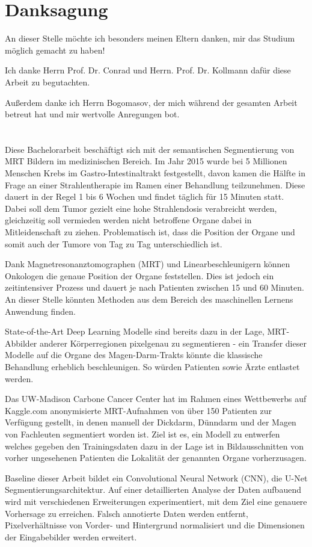 
\section*{Danksagung}

An dieser Stelle möchte ich besonders meinen Eltern danken, mir das Studium möglich gemacht zu haben!

Ich danke Herrn Prof. Dr. Conrad und Herrn. Prof. Dr. Kollmann dafür diese Arbeit zu begutachten.

Außerdem danke ich Herrn Bogomasov, der mich während der gesamten Arbeit betreut hat und mir wertvolle Anregungen bot. 

\pagebreak
\section*{}


Diese Bachelorarbeit beschäftigt sich mit der semantischen Segmentierung von MRT Bildern im medizinischen Bereich. Im Jahr 2015 wurde bei 5 Millionen Menschen Krebs im Gastro-Intestinaltrakt festgestellt, davon kamen die Hälfte in Frage an einer Strahlentherapie im Ramen einer Behandlung teilzunehmen. Diese dauert in der Regel 1 bis 6 Wochen und findet täglich für 15 Minuten statt. Dabei soll dem Tumor gezielt eine hohe Strahlendosis verabreicht werden, gleichzeitig soll vermieden werden nicht betroffene Organe dabei in Mitleidenschaft zu ziehen. Problematisch ist, dass  die Position der Organe und somit auch der Tumore von Tag zu Tag unterschiedlich ist. 

Dank Magnetresonanztomographen (MRT) und Linearbeschleunigern können Onkologen die genaue Position der Organe feststellen. Dies ist jedoch ein zeitintensiver Prozess und dauert je nach Patienten zwischen 15 und 60 Minuten. An dieser Stelle könnten Methoden aus dem Bereich des maschinellen Lernens Anwendung finden.

State-of-the-Art Deep Learning Modelle sind bereits dazu in der Lage, MRT-Abbilder anderer Körperregionen pixelgenau zu segmentieren - ein Transfer dieser Modelle auf die Organe des Magen-Darm-Trakts könnte die klassische Behandlung erheblich beschleunigen. So würden Patienten sowie Ärzte entlastet werden.

Das UW-Madison Carbone Cancer Center hat im Rahmen eines Wettbewerbs auf Kaggle.com anonymisierte MRT-Aufnahmen von über 150 Patienten zur Verfügung gestellt, in denen manuell der Dickdarm, Dünndarm und der Magen von Fachleuten segmentiert worden ist. Ziel ist es, ein Modell zu entwerfen welches gegeben den Trainingsdaten dazu in der Lage ist in Bildausschnitten von vorher ungesehenen Patienten die Lokalität der genannten Organe vorherzusagen. 

Baseline dieser Arbeit bildet ein Convolutional Neural Network (CNN), die U-Net Segmentierungsarchitektur. Auf einer detaillierten Analyse der Daten aufbauend wird mit verschiedenen Erweiterungen experimentiert, mit dem Ziel eine genauere Vorhersage zu erreichen. Falsch annotierte Daten werden entfernt, Pixelverhältnisse von Vorder- und Hintergrund normalisiert und die Dimensionen der Eingabebilder werden erweitert.